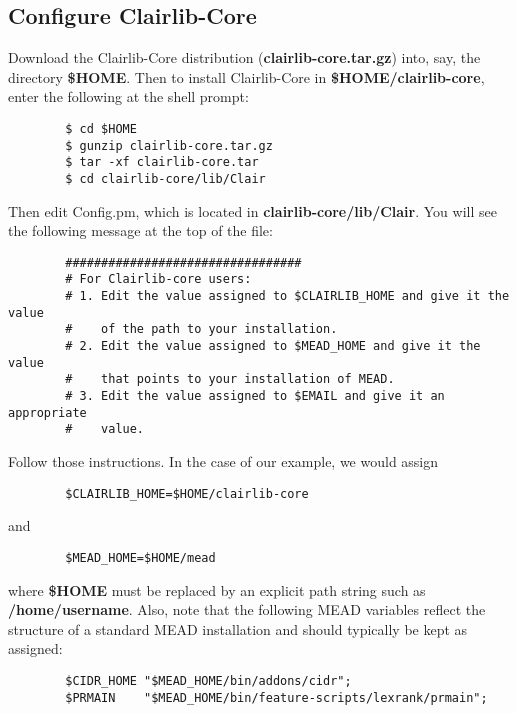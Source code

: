 \subsection*{Configure Clairlib-Core\label{Configure_Clairlib-Core}}


Download the Clairlib-Core distribution (\textbf{clairlib-core.tar.gz}) into, say, the directory \textbf{\$HOME}. Then to install Clairlib-Core in \textbf{\$HOME/clairlib-core}, enter the following at the shell prompt:

\begin{verbatim}
        $ cd $HOME
        $ gunzip clairlib-core.tar.gz
        $ tar -xf clairlib-core.tar
        $ cd clairlib-core/lib/Clair
\end{verbatim}


Then edit Config.pm, which is located in \textbf{clairlib-core/lib/Clair}. You will see the following message at the top of the file:

\begin{verbatim}
        #################################
        # For Clairlib-core users:
        # 1. Edit the value assigned to $CLAIRLIB_HOME and give it the value
        #    of the path to your installation.
        # 2. Edit the value assigned to $MEAD_HOME and give it the value
        #    that points to your installation of MEAD.
        # 3. Edit the value assigned to $EMAIL and give it an appropriate
        #    value.
\end{verbatim}


Follow those instructions. In the case of our example, we would assign

\begin{verbatim}
        $CLAIRLIB_HOME=$HOME/clairlib-core
\end{verbatim}


and

\begin{verbatim}
        $MEAD_HOME=$HOME/mead
\end{verbatim}


where \textbf{\$HOME} must be replaced by an explicit path string such as \textbf{/home/username}. Also, note that the following MEAD variables reflect the structure of a standard MEAD installation and should typically be kept as assigned:

\begin{verbatim}
        $CIDR_HOME "$MEAD_HOME/bin/addons/cidr";
        $PRMAIN    "$MEAD_HOME/bin/feature-scripts/lexrank/prmain";
\end{verbatim}
